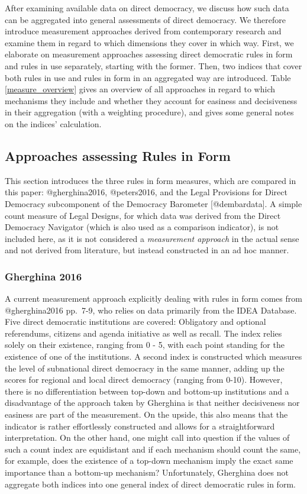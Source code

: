 \documentclass[]{article}
\title{}
\author{}
\date{}
\begin{document}
After examining available data on direct democracy, we discuss how such
data can be aggregated into general assessments of direct democracy. We
therefore introduce measurement approaches derived from contemporary
research and examine them in regard to which dimensions they cover in
which way. First, we elaborate on measurement approaches assessing
direct democratic rules in form and rules in use separately, starting
with the former. Then, two indices that cover both rules in use and
rules in form in an aggregated way are introduced. Table
\ref{measure_overview} gives an overview of all approaches in regard to
which mechanisms they include and whether they account for easiness and
decisiveness in their aggregation (with a weighting procedure), and
gives some general notes on the indices' calculation.

\subsection{Approaches assessing Rules in
Form}\label{approaches-assessing-rules-in-form}

This section introduces the three rules in form measures, which are
compared in this paper: @gherghina2016, @peters2016, and the Legal
Provisions for Direct Democracy subcomponent of the Democracy Barometer
{[}@dembardata{]}. A simple count measure of Legal Designs, for which
data was derived from the Direct Democracy Navigator (which is also used
as a comparison indicator), is not included here, as it is not
considered a \emph{measurement approach} in the actual sense and not
derived from literature, but instead constructed in an ad hoc manner.

\subsubsection{Gherghina 2016}\label{gherghina-2016}

A current measurement approach explicitly dealing with rules in form
comes from @gherghina2016 pp.~7-9, who relies on data primarily from the
IDEA Database. Five direct democratic institutions are covered:
Obligatory and optional referendums, citizens and agenda initiative as
well as recall. The index relies solely on their existence, ranging from
0 - 5, with each point standing for the existence of one of the
institutions. A second index is constructed which measures the level of
subnational direct democracy in the same manner, adding up the scores
for regional and local direct democracy (ranging from 0-10). However,
there is no differentiation between top-down and bottom-up institutions
and a disadvantage of the approach taken by Gherghina is that neither
decisiveness nor easiness are part of the measurement. On the upside,
this also means that the indicator is rather effortlessly constructed
and allows for a straightforward interpretation. On the other hand, one
might call into question if the values of such a count index are
equidistant and if each mechanism should count the same, for example,
does the existence of a top-down mechanism imply the exact same
importance than a bottom-up mechanism? Unfortunately, Gherghina does not
aggregate both indices into one general index of direct democratic rules
in form.
\end{document}
